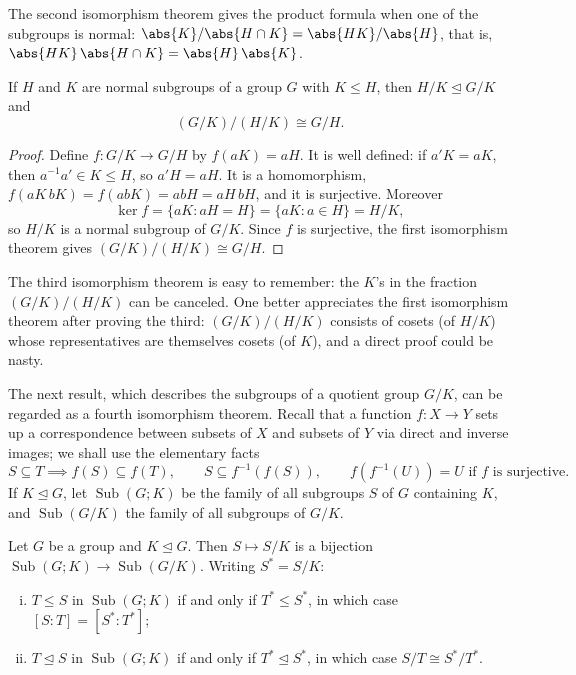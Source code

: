 The second isomorphism theorem gives the product formula when one of the subgroups is
normal: \(\abs{K}/\abs{H \cap K} = \abs{HK}/\abs{H}\), that is,
\(\abs{HK}\,\abs{H \cap K} = \abs{H}\,\abs{K}\).

\begin{theorem}\label{thm:third-iso}
	If \(H\) and \(K\) are normal subgroups of a group \(G\) with \(K \leq H\), then
	\(H/K \trianglelefteq G/K\) and
	\[
		(G/K)/(H/K) \cong G/H.
	\]
\end{theorem}

\begin{proof}
	Define \(f\colon G/K \to G/H\) by \(f(aK) = aH\). It is well defined: if \(a'K = aK\),
	then \(a^{-1}a' \in K \leq H\), so \(a'H = aH\). It is a homomorphism,
	\(f(aK\,bK) = f(abK) = abH = aH\,bH\), and it is surjective. Moreover
	\[
		\ker f = \{aK : aH = H\} = \{aK : a \in H\} = H/K,
	\]
	so \(H/K\) is a normal subgroup of \(G/K\). Since \(f\) is surjective, the first
	isomorphism theorem gives \((G/K)/(H/K) \cong G/H\).
\end{proof}

The third isomorphism theorem is easy to remember: the \(K\)'s in the fraction
\((G/K)/(H/K)\) can be canceled. One better appreciates the first isomorphism theorem
after proving the third: \((G/K)/(H/K)\) consists of cosets (of \(H/K\)) whose
representatives are themselves cosets (of \(K\)), and a direct proof could be nasty.

The next result, which describes the subgroups of a quotient group \(G/K\), can be regarded
as a fourth isomorphism theorem. Recall that a function \(f\colon X \to Y\) sets up a
correspondence between subsets of \(X\) and subsets of \(Y\) via direct and inverse images;
we shall use the elementary facts
\[
	S \subseteq T \implies f(S) \subseteq f(T), \qquad
	S \subseteq f^{-1}(f(S)), \qquad
	f(f^{-1}(U)) = U \text{ if } f \text{ is surjective}.
\]
If \(K \trianglelefteq G\), let \(\operatorname{Sub}(G;K)\) be the family of all subgroups
\(S\) of \(G\) containing \(K\), and \(\operatorname{Sub}(G/K)\) the family of all subgroups
of \(G/K\).

\begin{proposition}\label{prop:correspondence}
	Let \(G\) be a group and \(K \trianglelefteq G\). Then \(S \mapsto S/K\) is a bijection
	\(\operatorname{Sub}(G;K) \to \operatorname{Sub}(G/K)\). Writing \(S^* = S/K\):
	\begin{enumerate}[(i)]
		\item \(T \leq S\) in \(\operatorname{Sub}(G;K)\) if and only if \(T^* \leq S^*\), in
		      which case \([S : T] = [S^* : T^*]\);
		\item \(T \trianglelefteq S\) in \(\operatorname{Sub}(G;K)\) if and only if
		      \(T^* \trianglelefteq S^*\), in which case \(S/T \cong S^*/T^*\).
	\end{enumerate}
\end{proposition}

